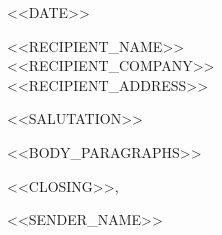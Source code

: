 \documentclass{article}
\begin{document}
\begin{center}
{\sffamily\LARGE\bfseries {}} \par\bigskip
\sffamily\footnotesize {} \par\bigskip
\end{center}

\vspace{1em}

\noindent <<DATE>>

\vspace{2em}
\noindent <<RECIPIENT_NAME>> \\
<<RECIPIENT_COMPANY>> \\
<<RECIPIENT_ADDRESS>>

\vspace{2em}
\noindent <<SALUTATION>>

\vspace{1em}
<<BODY_PARAGRAPHS>>

\vspace{2em}
\noindent <<CLOSING>>,

\vspace{2em}
\noindent <<SENDER_NAME>>
\end{document}
